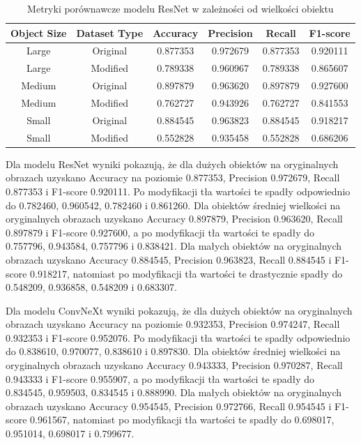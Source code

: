 \begin{table}
	\centering
	\begin{tabular}{|c|c|c|c|c|c|}
		\hline
		\textbf{Object Size} & \textbf{Dataset Type} & \textbf{Accuracy} & \textbf{Precision} & \textbf{Recall} & \textbf{F1-score} \\
		\hline
		Large & Original & 0.877353 & 0.972679 & 0.877353 & 0.920111 \\
		\hline
		Large & Modified & 0.789338 & 0.960967 & 0.789338 & 0.865607 \\
		\hline
		Medium & Original & 0.897879 & 0.963620 & 0.897879 & 0.927600 \\
		\hline
		Medium & Modified & 0.762727 & 0.943926 & 0.762727 & 0.841553 \\
		\hline
		Small & Original & 0.884545 & 0.963823 & 0.884545 & 0.918217 \\
		\hline
		Small & Modified & 0.552828 & 0.935458 & 0.552828 & 0.686206 \\
		\hline
	\end{tabular}
	\caption{Metryki porównawcze modelu ResNet w zależności od wielkości obiektu}
	\label{tab:resnet_object_size_metrics}
\end{table}

Dla modelu ResNet wyniki pokazują, że dla dużych obiektów na oryginalnych obrazach uzyskano Accuracy na poziomie 0.877353, Precision 0.972679, 
Recall 0.877353 i F1-score 0.920111. Po modyfikacji tła wartości te spadły odpowiednio do 0.782460, 0.960542, 0.782460 i 0.861260. Dla obiektów 
średniej wielkości na oryginalnych obrazach uzyskano Accuracy 0.897879, Precision 0.963620, Recall 0.897879 i F1-score 0.927600, a po modyfikacji 
tła wartości te spadły do 0.757796, 0.943584, 0.757796 i 0.838421. Dla małych obiektów na oryginalnych obrazach uzyskano Accuracy 0.884545, 
Precision 0.963823, Recall 0.884545 i F1-score 0.918217, natomiast po modyfikacji tła wartości te drastycznie spadły do 0.548209, 0.936858, 
0.548209 i 0.683307.

Dla modelu ConvNeXt wyniki pokazują, że dla dużych obiektów na oryginalnych obrazach uzyskano Accuracy na poziomie 0.932353, Precision 0.974247, 
Recall 0.932353 i F1-score 0.952076. Po modyfikacji tła wartości te spadły odpowiednio do 0.838610, 0.970077, 0.838610 i 0.897830. Dla obiektów 
średniej wielkości na oryginalnych obrazach uzyskano Accuracy 0.943333, Precision 0.970287, Recall 0.943333 i F1-score 0.955907, a po modyfikacji 
tła wartości te spadły do 0.834545, 0.959503, 0.834545 i 0.888990. Dla małych obiektów na oryginalnych obrazach uzyskano Accuracy 0.954545, 
Precision 0.972766, Recall 0.954545 i F1-score 0.961567, natomiast po modyfikacji tła wartości te spadły do 0.698017, 0.951014, 0.698017 i 0.799677.

